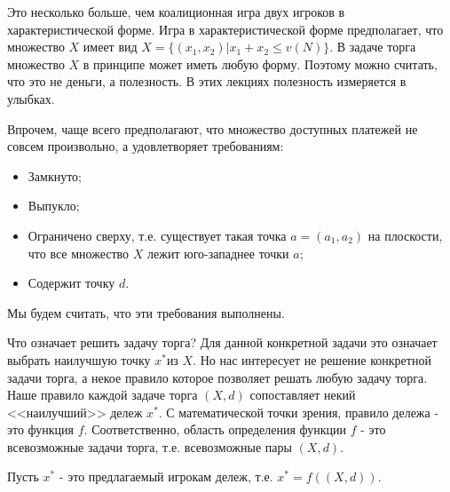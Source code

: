 Это несколько больше, чем коалиционная игра двух игроков в характеристической
форме. Игра в характеристической форме предполагает, что множество
$X$ имеет вид $X=\{(x_{1},x_{2})|x_{1}+x_{2}\leq v(N)\}$. В задаче
торга множество $X$ в принципе может иметь любую форму. Поэтому можно
считать, что это не деньги, а полезность. В этих лекциях полезность
измеряется в улыбках.

Впрочем, чаще всего предполагают, что множество доступных платежей не совсем
произвольно, а удовлетворяет требованиям:
\begin{itemize}
\item Замкнуто;
\item Выпукло;
\item Ограничено сверху, т.е. существует такая точка $a=(a_{1},a_{2})$
на плоскости, что все множество $X$ лежит юго-западнее точки $a$;
\item Содержит точку $d$.
\end{itemize}
Мы будем считать, что эти требования выполнены.

Что означает решить задачу торга? Для данной конкретной задачи это
означает выбрать наилучшую точку $x^{*}$из $X$. Но нас интересует
не решение конкретной задачи торга, а некое правило которое позволяет
решать любую задачу торга. Наше правило каждой задаче торга $(X,d)$
сопоставляет некий <<наилучший>> дележ $x^{*}$. С математической
точки зрения, правило дележа - это функция $f$. Соответственно, область
определения функции $f$ - это всевозможные задачи торга, т.е. всевозможные
пары $(X,d)$. 

Пусть $x^{*}$ - это предлагаемый игрокам дележ, т.е. $x^{*}=f((X,d))$.


